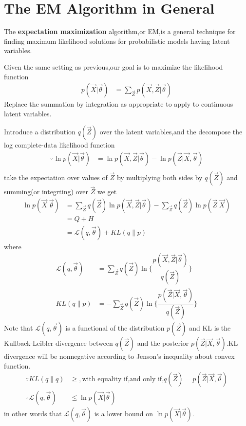 \section{The EM Algorithm in General}
The \textbf{expectation maximization} algorithm,or EM,is a general technique for finding maximum likelihood solutions for probabilistic models having latent variables.

Given the same setting as previous,our goal is to maximize the likelihood function
\begin{align}
p(\vec{X}|\vec{\theta}) &=\sum_{\vec{Z}}p(\vec{X},\vec{Z}|\vec{\theta}) 
\end{align}
Replace the summation by integration as appropriate to apply to continuous latent variables.

Introduce a distribution $q(\vec{Z})$ over the latent variables,and the decompose the log complete-data likelihood function
\begin{align}
\because \ln p(\vec{X}|\vec{\theta}) &=\ln p(\vec{X},\vec{Z}|\vec{\theta}) -\ln p(\vec{Z}|\vec{X},\vec{\theta}) \\
\end{align}
take the expectation over values of $\vec{Z}$ by multiplying both sides by $q(\vec{Z})$ and summing(or integrting) over $\vec{Z}$ we get
\begin{align}
\ln p(\vec{X}|\vec{\theta}) &=\sum_{\vec{Z}}q(\vec{Z})\ln p(\vec{X},\vec{Z}|\vec{\theta})-\sum_{\vec{Z}}q(\vec{Z})\ln p(\vec{Z}|\vec{X}) \\
&=Q+H \\
&=\mathcal{L}(q,\vec{\theta})+KL(q\parallel p)
\end{align}
where
\begin{align}\label{eqn:complete-data log likelihood decomposition}
\mathcal{L}(q,\vec{\theta})
&=\sum_{\vec{Z}}q(\vec{Z})\ln
\{\dfrac{p(\vec{X},\vec{Z}|\vec{\theta})}{q(\vec{Z})} \} \\
KL(q\parallel p)
&=-\sum_{\vec{Z}}{q(\vec{Z})\ln
	\{\dfrac{p(\vec{Z}|\vec{X},\vec{\theta})}
		 {q(\vec{Z})}\}}
\end{align}
Note that $\mathcal{L}(q,\vec{\theta})$ is a functional of the distribution $p(\vec{Z})$ and KL is the Kullback-Leibler divergence between $q(\vec{Z})$ and the posterior $p(\vec{Z}|\vec{X},\vec{\theta})$.KL divergence will be nonnegative according to Jenson's inequality about convex function.
\begin{align}
\because KL(q\parallel q)&\geq,\text{with equality if,and only if,}q(\vec{Z})=p(\vec{Z}|\vec{X},\vec{\theta})\\
\therefore
\mathcal{L}	(q,\vec{\theta})&\leq\ln p(\vec{X}|\vec{\theta})
\end{align}
in other words that $\mathcal{L}(q,\vec{\theta})$ is a lower bound on $\ln p(\vec{X}|\vec{\theta})$.

